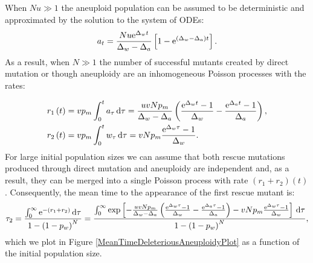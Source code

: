 \documentclass[12pt]{extarticle}
\renewcommand{\d}{{\rm d}}
\newcommand{\e}{{\rm e}}
\begin{document}
When $Nu\gg1$ the aneuploid population can be assumed to be deterministic and approximated by the solution to the system of ODEs:
\begin{equation}
a_t=\frac{Nu\e^{\Delta_wt}}{\Delta_w-\Delta_a}\left[1-\e^{\left(\Delta_w-\Delta_a\right)t}\right].
\end{equation}
As a result, when $N\gg1$ the number of successful mutants created by direct mutation or though aneuploidy are an inhomogeneous Poisson processes with the rates:




%

\begin{align*}
r_1\left(t\right)&=vp_m\int_0^ta_{\tau}\,\d\tau=\frac{uvNp_m}{\Delta_w-\Delta_a}\left(\frac{\e^{\Delta_wt}-1}{\Delta_w}-\frac{\e^{\Delta_at}-1}{\Delta_a}\right),\\
r_2\left(t\right)&=vp_m\int_0^tw_{\tau}\,\d\tau=vNp_m\frac{\e^{\Delta_w\tau}-1}{\Delta_w}.
\end{align*}
For large initial population sizes we can assume that both rescue mutations produced through direct mutation and aneuploidy are independent and, as a result, they can be merged into a single Poisson process with rate $\left(r_1+r_2\right)\left(t\right)$. Consequently, the mean time to the appearance of the first rescue mutant is: 
\begin{align}\label{meantimet2}
\tau_2=\frac{\int_0^\infty\e^{-\left(r_1+r_2\right)}\,\d\tau}{1-\left(1-p_w\right)^N}=\frac{\int_0^\infty\exp\left[-\frac{uvNp_m}{\Delta_w-\Delta_a}\left(\frac{\e^{\Delta_w\tau}-1}{\Delta_w}-\frac{\e^{\Delta_a\tau}-1}{\Delta_a}\right)-vNp_m\frac{\e^{\Delta_w\tau}-1}{\Delta_w}\right]\,\d\tau}{1-\left(1-p_w\right)^N},
\end{align}
which we plot in Figure \ref{MeanTimeDeleteriousAneuploidyPlot} as a function of the initial population size.
\end{document}
